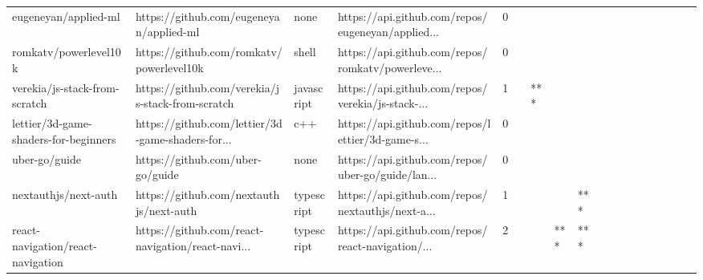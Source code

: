 \begin{tabular}{llllrlllllllllllll}
eugeneyan/applied-ml                               &            https://github.com/eugeneyan/applied-ml &              none &  https://api.github.com/repos/eugeneyan/applied... &       0 &         &        &           &                &                 &        &           &           &          &          &       &              &          \\
romkatv/powerlevel10k                              &           https://github.com/romkatv/powerlevel10k &             shell &  https://api.github.com/repos/romkatv/powerleve... &       0 &         &        &           &                &                 &        &           &           &          &          &       &              &          \\
verekia/js-stack-from-scratch                      &   https://github.com/verekia/js-stack-from-scratch &        javascript &  https://api.github.com/repos/verekia/js-stack-... &       1 &         &    *** &           &                &                 &        &           &           &          &          &       &              &          \\
lettier/3d-game-shaders-for-beginners              &  https://github.com/lettier/3d-game-shaders-for... &               c++ &  https://api.github.com/repos/lettier/3d-game-s... &       0 &         &        &           &                &                 &        &           &           &          &          &       &              &          \\
uber-go/guide                                      &                   https://github.com/uber-go/guide &              none &  https://api.github.com/repos/uber-go/guide/lan... &       0 &         &        &           &                &                 &        &           &           &          &          &       &              &          \\
nextauthjs/next-auth                               &            https://github.com/nextauthjs/next-auth &        typescript &  https://api.github.com/repos/nextauthjs/next-a... &       1 &         &        &           &            *** &                 &        &           &           &          &          &       &              &          \\
react-navigation/react-navigation                  &  https://github.com/react-navigation/react-navi... &        typescript &  https://api.github.com/repos/react-navigation/... &       2 &         &        &       *** &            *** &                 &        &           &           &          &          &       &              &          \\

\end{tabular}
